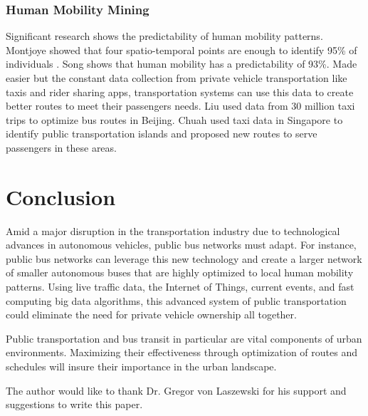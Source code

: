 \documentclass[sigconf]{acmart}
\begin{document}
\subsubsection{Human Mobility Mining} Significant research shows the predictability of human mobility patterns. Montjoye \cite{Montjoye01} showed that four spatio-temporal points are enough to identify 95\% of individuals \cite{Liu01}. Song \cite{Song01} shows that human mobility has a predictability of 93\%. Made easier but the constant data collection from private vehicle transportation like taxis and rider sharing apps, transportation systems can use this data to create better routes to meet their passengers needs. Liu \cite{Liu01} used data from 30 million taxi trips to optimize bus routes in Beijing. Chuah \cite{Chuah01} used taxi data in Singapore to identify public transportation islands and proposed new routes to serve passengers in these areas. 

\section{Conclusion}
Amid a major disruption in the transportation industry due to technological advances in autonomous vehicles, public bus networks must adapt. For instance, public bus networks can leverage this new technology and create a larger network of smaller autonomous buses that are highly optimized to local human mobility patterns. Using live traffic data, the Internet of Things, current events, and fast computing big data algorithms, this advanced system of public transportation could eliminate the need for private vehicle ownership all together.

Public transportation and bus transit in particular are vital components of urban environments. Maximizing their effectiveness through optimization of routes and schedules will insure their importance in the urban landscape.

\begin{acks}
The author would like to thank Dr. Gregor von Laszewski for his support and suggestions to write this paper.
\end{acks}


 
\end{document}
